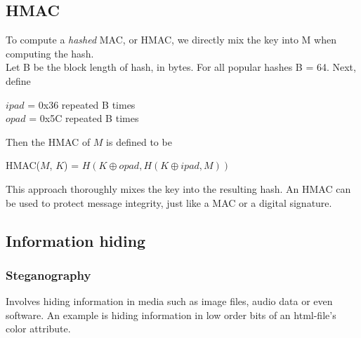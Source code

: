\documentclass[a4paper]{article}
\begin{document}
\subsection{HMAC}
To compute a \textit{hashed} MAC, or HMAC, we directly mix the key into M when computing the hash.\\
Let B be the block length of hash, in bytes. For all popular hashes B = 64. Next, define
\begin{center}
    $ipad$ = 0x36 repeated B times\\
    $opad$ = 0x5C repeated B times
\end{center}    
Then the HMAC of $M$ is defined to be
\begin{center}
    HMAC($M$, $K$) = $H(K \oplus opad, H(K \oplus ipad, M))$
\end{center}
This approach thoroughly mixes the key into the resulting hash. An HMAC can be used to protect message integrity, just like a MAC or a digital signature.
\newpage
\subsection{Information hiding}
\subsubsection{Steganography}
Involves hiding information in media such as image files, audio data or even software. An example is hiding information in low order bits of an html-file's color attribute.
\end{document}
